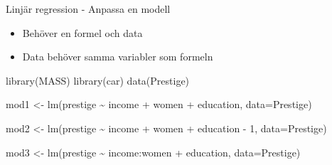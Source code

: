 \documentclass[
  11pt,
  ignorenonframetext,
  handout]{beamer}
\newenvironment{Shaded}{\begin{snugshade}}{\end{snugshade}}
\newcommand{\AttributeTok}[1]{\textcolor[rgb]{0.77,0.63,0.00}{#1}}
\newcommand{\DecValTok}[1]{\textcolor[rgb]{0.00,0.00,0.81}{#1}}
\newcommand{\FunctionTok}[1]{\textcolor[rgb]{0.00,0.00,0.00}{#1}}
\newcommand{\NormalTok}[1]{#1}
\newcommand{\OtherTok}[1]{\textcolor[rgb]{0.56,0.35,0.01}{#1}}
\newcommand{\SpecialCharTok}[1]{\textcolor[rgb]{0.00,0.00,0.00}{#1}}
\providecommand{\tightlist}{%
  \setlength{\itemsep}{0pt}\setlength{\parskip}{0pt}}
\begin{document}
\begin{frame}[fragile]{Linjär regression - Anpassa en modell}
\protect\hypertarget{linjuxe4r-regression---anpassa-en-modell}{}
\begin{itemize}
\tightlist
\item
  Behöver en formel och data
\item
  Data behöver samma variabler som formeln
\end{itemize}

\begin{Shaded}
\begin{Highlighting}[]
\FunctionTok{library}\NormalTok{(MASS)}
\FunctionTok{library}\NormalTok{(car)}
\FunctionTok{data}\NormalTok{(Prestige)}
\end{Highlighting}
\end{Shaded}

\begin{Shaded}
\begin{Highlighting}[]
\NormalTok{mod1 }\OtherTok{\textless{}{-}} \FunctionTok{lm}\NormalTok{(prestige }\SpecialCharTok{\textasciitilde{}}\NormalTok{ income }\SpecialCharTok{+}\NormalTok{ women }\SpecialCharTok{+}\NormalTok{ education, }\AttributeTok{data=}\NormalTok{Prestige)}
\end{Highlighting}
\end{Shaded}

\begin{Shaded}
\begin{Highlighting}[]
\NormalTok{mod2 }\OtherTok{\textless{}{-}} \FunctionTok{lm}\NormalTok{(prestige }\SpecialCharTok{\textasciitilde{}}\NormalTok{ income }\SpecialCharTok{+}\NormalTok{ women }\SpecialCharTok{+}\NormalTok{ education }\SpecialCharTok{{-}} \DecValTok{1}\NormalTok{, }\AttributeTok{data=}\NormalTok{Prestige)}
\end{Highlighting}
\end{Shaded}

\begin{Shaded}
\begin{Highlighting}[]
\NormalTok{mod3 }\OtherTok{\textless{}{-}} \FunctionTok{lm}\NormalTok{(prestige }\SpecialCharTok{\textasciitilde{}}\NormalTok{ income}\SpecialCharTok{:}\NormalTok{women }\SpecialCharTok{+}\NormalTok{ education, }\AttributeTok{data=}\NormalTok{Prestige)}
\end{Highlighting}
\end{Shaded}
\end{frame}
\end{document}
